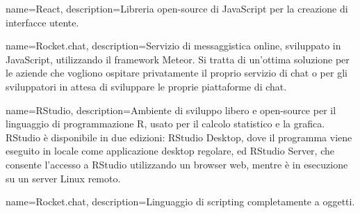 {
	name=React,
	description={Libreria open-source di JavaScript per la creazione di interfacce utente.}
}

{
	name=Rocket.chat,
	description={Servizio di messaggistica online, sviluppato in JavaScript, utilizzando il framework Meteor. Si tratta di un'ottima soluzione per le aziende che vogliono ospitare privatamente il proprio servizio di chat o per gli sviluppatori in attesa di sviluppare le proprie piattaforme di chat.}
}

{
	name=RStudio,
	description={Ambiente di sviluppo libero e open-source per il linguaggio di programmazione R, usato per il calcolo statistico e la grafica. RStudio è disponibile in due edizioni: RStudio Desktop, dove il programma viene eseguito in locale come applicazione desktop regolare, ed RStudio Server, che consente l'accesso a RStudio utilizzando un browser web, mentre è in esecuzione su un server Linux remoto.}
}

{
	name=Rocket.chat,
	description={Linguaggio di scripting completamente a oggetti.}
}